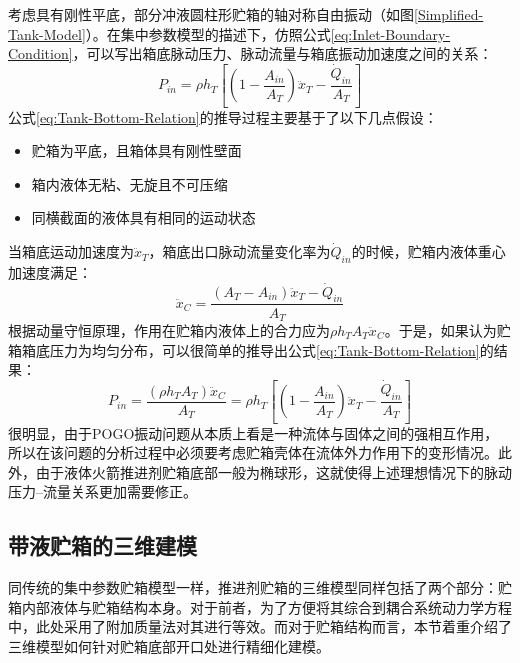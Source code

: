 考虑具有刚性平底，部分冲液圆柱形贮箱的轴对称自由振动（如图\ref{Simplified-Tank-Model}）。在集中参数模型的描述下，仿照公式\eqref{eq:Inlet-Boundary-Condition}，可以写出箱底脉动压力、脉动流量与箱底振动加速度之间的关系：
\begin{equation}
	\label{eq:Tank-Bottom-Relation}
	P_{in}=\rho h_T\left[ \left( 1-\frac{A_{in}}{A_T} \right) \ddot{x}_T- \frac{\dot{Q}_{in} }{A_T} \right]
\end{equation}
公式\eqref{eq:Tank-Bottom-Relation}的推导过程主要基于了以下几点假设：
\begin{itemize}
\item 贮箱为平底，且箱体具有刚性壁面
\item 箱内液体无粘、无旋且不可压缩
\item 同横截面的液体具有相同的运动状态
\end{itemize}
当箱底运动加速度为$\ddot{x}_T$，箱底出口脉动流量变化率为$\dot{Q}_{in}$的时候，贮箱内液体重心加速度满足：
\begin{equation}
	\ddot{x}_C=\frac{(A_T-A_{in})\ddot{x}_T-\dot{Q}_{in} }{A_T}
\end{equation}
根据动量守恒原理，作用在贮箱内液体上的合力应为$\rho h_T A_T\ddot{x}_C $。于是，如果认为贮箱箱底压力为均匀分布，可以很简单的推导出公式\eqref{eq:Tank-Bottom-Relation}的结果：
\begin{equation}
	P_{in}=\frac{(\rho h_T A_T)\ddot{x}_C}{A_T} =\rho h_T\left[ \left( 1-\frac{A_{in}}{A_T} \right) \ddot{x}_T- \frac{\dot{Q}_{in} }{A_T} \right]
\end{equation}
很明显，由于POGO振动问题从本质上看是一种流体与固体之间的强相互作用，所以在该问题的分析过程中必须要考虑贮箱壳体在流体外力作用下的变形情况。此外，由于液体火箭推进剂贮箱底部一般为椭球形，这就使得上述理想情况下的脉动压力--流量关系更加需要修正。

\subsection{带液贮箱的三维建模}
\label{sec:Three-Dimensional-Tank-Model}
同传统的集中参数贮箱模型一样，推进剂贮箱的三维模型同样包括了两个部分：贮箱内部液体与贮箱结构本身。对于前者，为了方便将其综合到耦合系统动力学方程中，此处采用了附加质量法对其进行等效\cite{Brennen:1982, Conca:1997, Liu-Huanzhong:2005}。而对于贮箱结构而言，本节着重介绍了三维模型如何针对贮箱底部开口处进行精细化建模。

